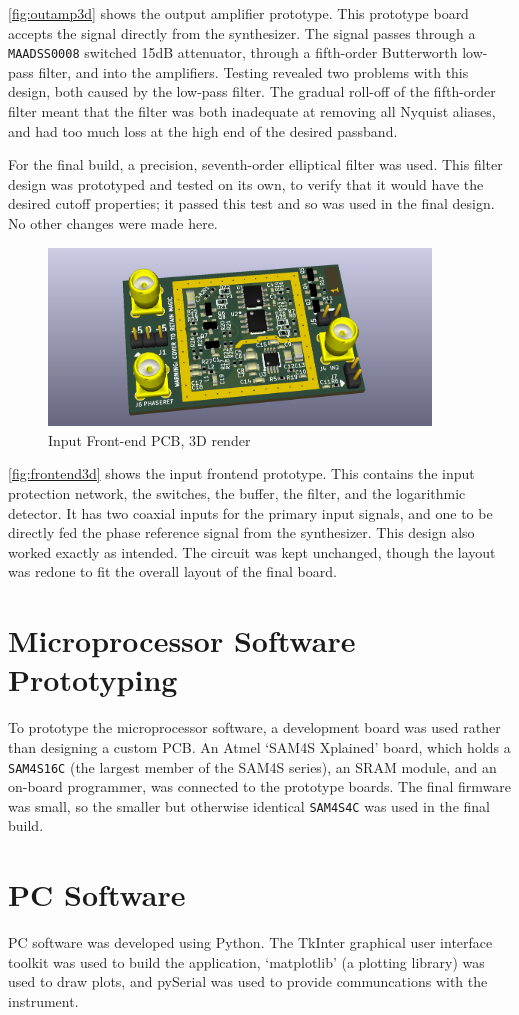 \autoref{fig:outamp3d} shows the output amplifier prototype. This prototype board accepts
the signal directly from the synthesizer. The signal passes through a \texttt{MAADSS0008}
switched 15\;dB attenuator, through a fifth-order Butterworth low-pass filter, and into
the amplifiers. Testing revealed two problems with this design, both caused by the low-pass
filter. The gradual roll-off of the fifth-order filter meant that the filter was both
inadequate at removing all Nyquist aliases, and had too much loss at the high end of the
desired passband.

For the final build, a precision, seventh-order elliptical filter was used. This filter
design was prototyped and tested on its own, to verify that it would have the desired
cutoff properties; it passed this test and so was used in the final design. No other
changes were made here.

\begin{figure}[H]
\centering
\includegraphics[width=4in]{frontend3d.png}
\caption{Input Front-end PCB, 3D render}
\label{fig:front3d}
\end{figure}

\autoref{fig:frontend3d} shows the input frontend prototype. This contains the input
protection network, the switches, the buffer, the filter, and the logarithmic detector.
It has two coaxial inputs for the primary input signals, and one to be directly fed the
phase reference signal from the synthesizer. This design also worked exactly as intended.
The circuit was kept unchanged, though the layout was redone to fit the overall layout of
the final board.

\section{Microprocessor Software Prototyping}

To prototype the microprocessor software, a development board was used rather than
designing a custom PCB. An Atmel `SAM4S Xplained' board, which holds a \texttt{SAM4S16C}
(the largest member of the SAM4S series), an SRAM module, and an on-board programmer, was
connected to the prototype boards. The final firmware was small, so the smaller but otherwise
identical \texttt{SAM4S4C} was used in the final build.

\section{PC Software}

PC software was developed using Python. The TkInter graphical user interface toolkit was
used to build the application, `matplotlib' (a plotting library) was used to draw plots,
and pySerial was used to provide communcations with the instrument.
